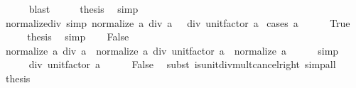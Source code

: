 \begin{isabellebody}
\ \ \ \ \isamarkupfalse%
\ blast\isanewline
\ \ \isamarkupfalse%
\ \isamarkupfalse%
\ {\isacharquery}{\kern0pt}thesis\ \isamarkupfalse%
\ simp\isanewline
{}\isamarkupfalse%
%
\endisatagproof
{\isafoldproof}%
%
\isadelimproof
\isanewline
%
\endisadelimproof
\isanewline
{}\isamarkupfalse%
\ normalize{\isacharunderscore}{\kern0pt}div\ {\isacharbrackleft}{\kern0pt}simp{\isacharbrackright}{\kern0pt}{\isacharcolon}{\kern0pt}\ {\isachardoublequoteopen}normalize\ a\ div\ a\ {\isacharequal}{\kern0pt}\ {}\ div\ unit{\isacharunderscore}{\kern0pt}factor\ a{\isachardoublequoteclose}\isanewline
%
\isadelimproof
%
\endisadelimproof
%
\isatagproof
{}\isamarkupfalse%
\ {\isacharparenleft}{\kern0pt}cases\ {\isachardoublequoteopen}a\ {\isacharequal}{\kern0pt}\ {}{\isachardoublequoteclose}{\isacharparenright}{\kern0pt}\isanewline
\ \ \isamarkupfalse%
\ True\isanewline
\ \ \isamarkupfalse%
\ \isamarkupfalse%
\ {\isacharquery}{\kern0pt}thesis\ \isamarkupfalse%
\ simp\isanewline
{}\isamarkupfalse%
\isanewline
\ \ \isamarkupfalse%
\ False\isanewline
\ \ \isamarkupfalse%
\ {\isachardoublequoteopen}normalize\ a\ div\ a\ {\isacharequal}{\kern0pt}\ normalize\ a\ div\ {\isacharparenleft}{\kern0pt}unit{\isacharunderscore}{\kern0pt}factor\ a\ {\isacharasterisk}{\kern0pt}\ normalize\ a{\isacharparenright}{\kern0pt}{\isachardoublequoteclose}\isanewline
\ \ \ \ \isamarkupfalse%
\ simp\isanewline
\ \ \isamarkupfalse%
\ \isamarkupfalse%
\ {\isachardoublequoteopen}{\isasymdots}\ {\isacharequal}{\kern0pt}\ {}\ div\ unit{\isacharunderscore}{\kern0pt}factor\ a{\isachardoublequoteclose}\isanewline
\ \ \ \ \isamarkupfalse%
\ False\ \isamarkupfalse%
\ {\isacharparenleft}{\kern0pt}subst\ is{\isacharunderscore}{\kern0pt}unit{\isacharunderscore}{\kern0pt}div{\isacharunderscore}{\kern0pt}mult{\isacharunderscore}{\kern0pt}cancel{\isacharunderscore}{\kern0pt}right{\isacharparenright}{\kern0pt}\ simp{\isacharunderscore}{\kern0pt}all\isanewline
\ \ \isamarkupfalse%
\ \isamarkupfalse%
\ {\isacharquery}{\kern0pt}thesis\ \isacommand{{\isachardot}{\kern0pt}}\isamarkupfalse%
\isanewline
{}\isamarkupfalse%
%
\endisatagproof
{\isafoldproof}%
%
\isadelimproof
\isanewline
%
\endisadelimproof
\isanewline
{}\isamarkupfalse%

\end{isabellebody}
